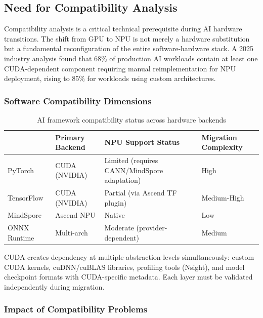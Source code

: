 \subsection{Need for Compatibility Analysis}
\label{subsec:compatibility-need}

Compatibility analysis is a critical technical prerequisite during AI hardware
transitions. The shift from GPU to NPU is not merely a hardware substitution
but a fundamental reconfiguration of the entire software-hardware stack. A 2025
industry analysis found that 68\% of production AI workloads contain at least
one CUDA-dependent component requiring manual reimplementation for NPU
deployment, rising to 85\% for workloads using custom architectures.

\subsubsection{Software Compatibility Dimensions}

\begin{table}[htbp]
  \centering
  \caption{AI framework compatibility status across hardware backends}
  \label{tab:framework-compat}
  \begin{tabularx}{\textwidth}{llXl}
    \toprule
    \tableheader{Framework & Primary Backend & NPU Support Status & Migration Complexity} \\
    \midrule
    PyTorch      & CUDA (NVIDIA)    & Limited (requires CANN/MindSpore adaptation) & High \\
    \rowcolor{TableRowOdd}
    TensorFlow   & CUDA (NVIDIA)    & Partial (via Ascend TF plugin)               & Medium-High \\
    MindSpore    & Ascend NPU       & Native                                       & Low \\
    \rowcolor{TableRowOdd}
    ONNX Runtime & Multi-arch       & Moderate (provider-dependent)                & Medium \\
    \bottomrule
  \end{tabularx}
\end{table}

CUDA creates dependency at multiple abstraction levels simultaneously:
custom CUDA kernels, cuDNN/cuBLAS libraries, profiling tools (Nsight), and
model checkpoint formats with CUDA-specific metadata. Each layer must be
validated independently during migration.

\subsubsection{Impact of Compatibility Problems}

